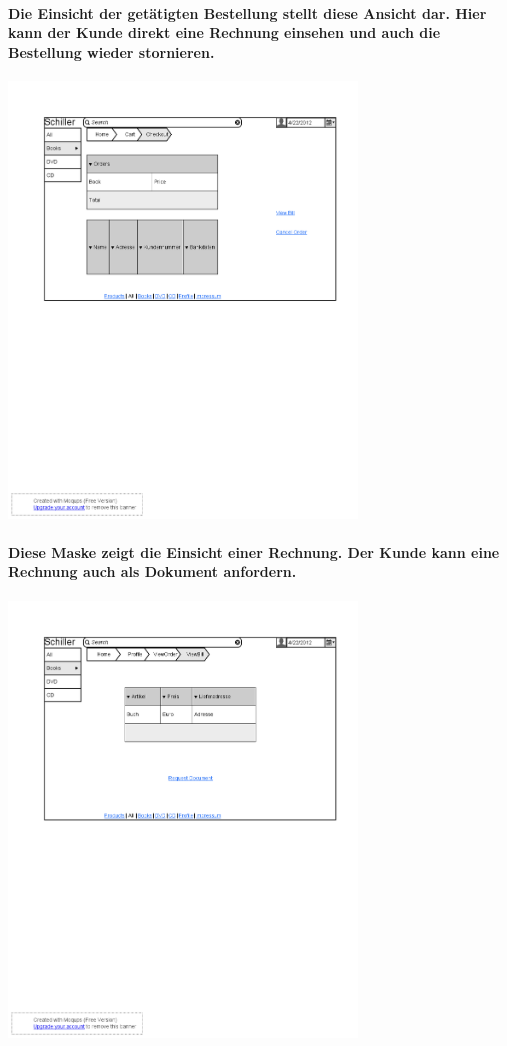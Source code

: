 \documentclass[a4paper]{article}
\begin{document}
\paragraph{Die Einsicht der getätigten Bestellung stellt diese Ansicht dar. Hier kann der Kunde direkt eine Rechnung einsehen und auch die Bestellung wieder stornieren.\\}
\includegraphics[width=350px]{11OrderView.png}

\paragraph{Diese Maske zeigt die Einsicht einer Rechnung. Der Kunde kann eine Rechnung auch als Dokument anfordern.\\}
\includegraphics[width=350px]{12BillView.png}
\end{document}
